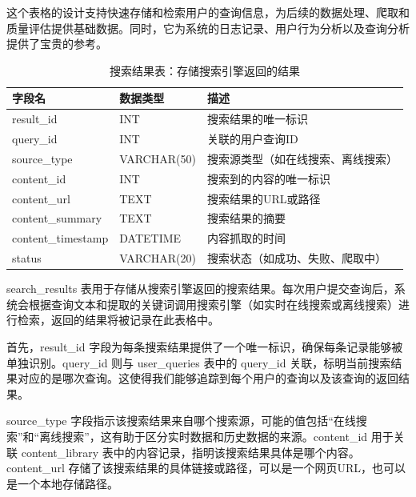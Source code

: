 这个表格的设计支持快速存储和检索用户的查询信息，为后续的数据处理、爬取和质量评估提供基础数据。同时，它为系统的日志记录、用户行为分析以及查询分析提供了宝贵的参考。
\begin{table}[H]
\centering
\caption{搜索结果表：存储搜索引擎返回的结果}
\label{tab:search_results}
{\renewcommand{\arraystretch}{1}
\begin{tabular}{|p{3cm}|p{3cm}|p{6cm}|}
\hline
\textbf{字段名} & \textbf{数据类型} & \textbf{描述} \\ \hline
result\_id & INT & 搜索结果的唯一标识 \\ \hline
query\_id & INT & 关联的用户查询ID \\ \hline
source\_type & VARCHAR(50) & 搜索源类型（如在线搜索、离线搜索） \\ \hline
content\_id & INT & 搜索到的内容的唯一标识 \\ \hline
content\_url & TEXT & 搜索结果的URL或路径 \\ \hline
content\_summary & TEXT & 搜索结果的摘要 \\ \hline
content\_timestamp & DATETIME & 内容抓取的时间 \\ \hline
status & VARCHAR(20) & 搜索状态（如成功、失败、爬取中） \\ \hline
\end{tabular}
}
\end{table}
search\_results 表用于存储从搜索引擎返回的搜索结果。每次用户提交查询后，系统会根据查询文本和提取的关键词调用搜索引擎（如实时在线搜索或离线搜索）进行检索，返回的结果将被记录在此表格中。

首先，result\_id 字段为每条搜索结果提供了一个唯一标识，确保每条记录能够被单独识别。query\_id 则与 user\_queries 表中的 query\_id 关联，标明当前搜索结果对应的是哪次查询。这使得我们能够追踪到每个用户的查询以及该查询的返回结果。

source\_type 字段指示该搜索结果来自哪个搜索源，可能的值包括“在线搜索”和“离线搜索”，这有助于区分实时数据和历史数据的来源。content\_id 用于关联 content\_library 表中的内容记录，指明该搜索结果具体是哪个内容。content\_url 存储了该搜索结果的具体链接或路径，可以是一个网页URL，也可以是一个本地存储路径。

